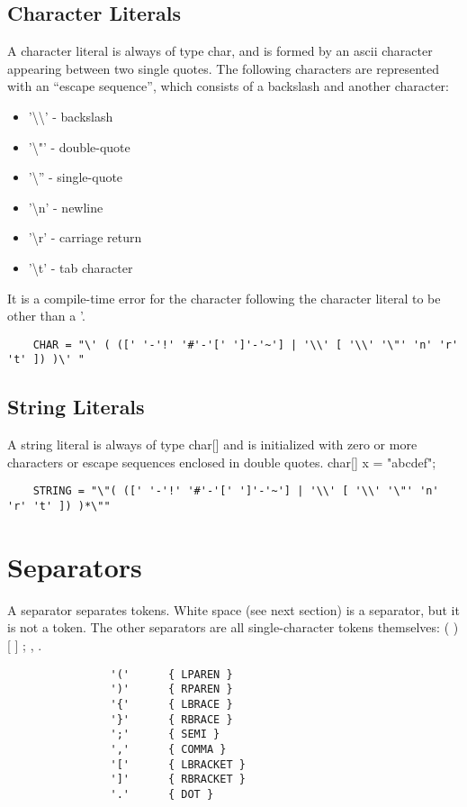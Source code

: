 \begin{homeworkProblem}
	\subsection{Character Literals}
	A character literal is always of type char, and is formed by an ascii character appearing between two single quotes. The following characters are represented with an “escape sequence”, which consists of a backslash and another character:\\
	\begin{itemize}
		\item '\textbackslash\textbackslash' - backslash
		\item '\textbackslash"' - double-quote
		\item '\textbackslash'' - single-quote
		\item '\textbackslash n' - newline
		\item '\textbackslash r' - carriage return
		\item '\textbackslash t' - tab character
	\end{itemize}
	It is a compile-time error for the character following the character literal to be other than a '.
	
	\begin{verbatim}
	CHAR = "\' ( ([' '-'!' '#'-'[' ']'-'~'] | '\\' [ '\\' '\"' 'n' 'r' 't' ]) )\' "
	\end{verbatim}
	
	
	\subsection{String Literals}
	A string literal is always of type char[] and is initialized with zero or more characters or escape sequences enclosed in double quotes.
	char[] x = "abcdef";
	
	\begin{verbatim}
	STRING = "\"( ([' '-'!' '#'-'[' ']'-'~'] | '\\' [ '\\' '\"' 'n' 'r' 't' ]) )*\""
	\end{verbatim}
	
	\section{Separators}
	A separator separates tokens. White space (see next section) is a separator, but it is not a token. The other separators are all single-character tokens themselves:
	     ( ) [ ] { } ; , .
	\begin{verbatim}
				'('      { LPAREN }
				')'      { RPAREN }
				'{'      { LBRACE }
				'}'      { RBRACE }
				';'      { SEMI }
				','      { COMMA }
				'['      { LBRACKET }
				']'      { RBRACKET }
				'.'      { DOT }
 	\end{verbatim}
 	

\end{homeworkProblem}
